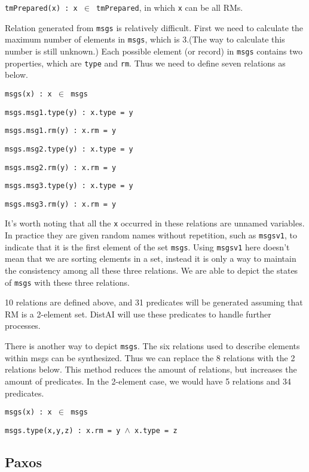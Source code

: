{\texttt{tmPrepared(x) : x $\in$ tmPrepared}}, in which {\texttt{x}} can be all RMs.

Relation generated from {\texttt{msgs}} is relatively difficult. First we need to calculate the maximum number of elements in {\texttt{msgs}}, which is 3.(The way to calculate this number is still unknown.) Each possible element (or record) in {\texttt{msgs}} contains two properties, which are {\texttt{type}} and {\texttt{rm}}. Thus we need to define seven relations as below.


{\texttt{msgs(x) : x $\in$ msgs}}

{\texttt{msgs.msg1.type(y) : x.type = y}}

{\texttt{msgs.msg1.rm(y) : x.rm = y}}

{\texttt{msgs.msg2.type(y) : x.type = y}}

{\texttt{msgs.msg2.rm(y) : x.rm = y}}

{\texttt{msgs.msg3.type(y) : x.type = y}}

{\texttt{msgs.msg3.rm(y) : x.rm = y}}


It's worth noting that all the {\texttt{x}} occurred in these relations are unnamed variables. In practice they are given random names without repetition, such as {\texttt{msgsv1}}, to indicate that it is the first element of the set {\texttt{msgs}}. Using {\texttt{msgsv1}} here doesn't mean that we are sorting elements in a set, instead it is only a way to maintain the consistency among all these three relations. We are able to depict the states of {\texttt{msgs}} with these three relations.

10 relations are defined above, and 31 predicates will be generated assuming that RM is a 2-element set. DistAI will use these predicates to handle further processes.

There is another way to depict {\texttt{msgs}}. The six relations used to describe elements within msgs can be synthesized. Thus we can replace the 8 relations with the 2 relations below. This method reduces the amount of relations, but increases the amount of predicates. In the 2-element case, we would have 5 relations and 34 predicates.

{\texttt{msgs(x) : x $\in$ msgs}}

{\texttt{msgs.type(x,y,z) : x.rm = y $\land$ x.type = z}}

\subsection{Paxos} \label{ss:paxos}

